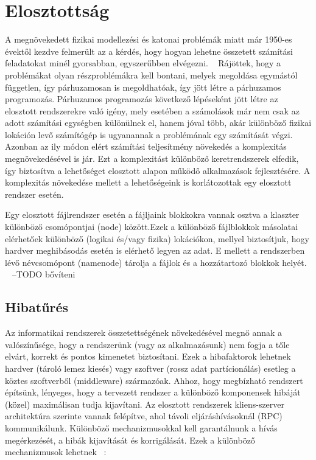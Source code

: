 \documentclass[a4paper,12pt]{article}
\begin{document}
\section{Elosztottság}
A megnövekedett fizikai modellezési és katonai problémák miatt már 1950-es évektől kezdve felmerült az a kérdés, hogy hogyan lehetne összetett számítási feladatokat minél gyorsabban, egyszerűbben elvégezni. ~\cite{cocke} Rájöttek, hogy a problémákat olyan részproblémákra kell bontani, melyek megoldása egymástól független, így párhuzamosan is megoldhatóak, így jött létre a párhuzamos programozás. \linebreak
Párhuzamos programozás következő lépéseként jött létre az elosztott rendszerekre való igény, mely esetében a számolások már nem csak az adott számítási egységben különülnek el, hanem jóval több, akár különböző fizikai lokáción levő számítógép is ugyanannak a problémának egy számítását végzi. Azonban az ily módon elért számítási teljesítmény növekedés a komplexitás megnövekedésével is jár. Ezt a komplexitást különböző keretrendszerek elfedik, így biztosítva a lehetőséget elosztott alapon működő alkalmazások fejlesztésére. A komplexitás növekedése mellett a lehetőségeink is korlátozottak egy elosztott rendszer esetén. \linebreak \linebreak

Egy elosztott fájlrendszer esetén a fájljaink blokkokra vannak osztva a klaszter különböző csomópontjai (node) között.Ezek a különböző fájlblokkok másolatai elérhetőek különböző (logikai és/vagy fizika) lokációkon, mellyel biztosítjuk, hogy hardver meghibásodás esetén is elérhető legyen az adat. E mellett a rendszerben lévő névcsomópont (namenode) tárolja a fájlok és a hozzátartozó blokkok helyét. ~\cite{hdfs}
--TODO bővíteni

\subsection{Hibatűrés}

Az informatikai rendszerek összetettségének növekedésével megnő annak a valószínűsége, hogy a rendszerünk (vagy az alkalmazásunk) nem fogja a tőle elvárt, korrekt és pontos kimenetet biztosítani. Ezek a hibafaktorok lehetnek hardver (tároló lemez kiesés) vagy szoftver (rossz adat partícionálás) esetleg a köztes szoftverből (middleware) származóak. Ahhoz, hogy megbízható rendszert építsünk, lényeges, hogy a tervezett rendszer a különböző komponensek hibáját (közel) maximálisan tudja kijavítani. Az elosztott rendszerek kliens-szerver architektúra szerinte vannak felépítve, ahol távoli eljáráshívásoknál (RPC) kommunikálunk. Különböző mechanizmusokkal kell garantálnunk a hívás megérkezését, a hibák kijavítását és korrigálását. Ezek a különböző mechanizmusok lehetnek ~\cite{szemantika}:
\end{document}
